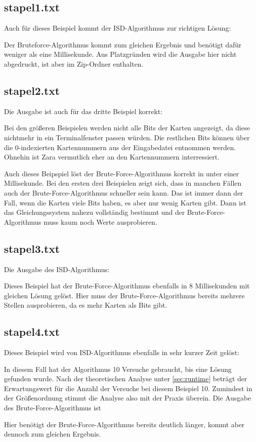 \documentclass[a4paper,10pt,ngerman]{scrartcl}
\begin{document}
\subsection*{stapel1.txt}
Auch für dieses Beispiel kommt der ISD-Algorithmus zur richtigen Lösung:

Der Bruteforce-Algorithmus kommt zum gleichen Ergebnis und benötigt dafür weniger als eine Millisekunde. Aus Platzgründen wird die Ausgabe hier nicht abgedruckt, ist aber im Zip-Ordner enthalten.
\subsection*{stapel2.txt}
Die Ausgabe ist auch für das dritte Beispiel korrekt:

Bei den größeren Beispielen werden nicht alle Bits der Karten angezeigt, da diese nichtmehr in ein Terminalfenster passen würden. Die restlichen Bits können über die 0-indexierten Kartennummern aus der Eingabedatei entnommen werden. Ohnehin ist Zara vermutlich eher an den Kartennummern interressiert. 

Auch dieses Beipspiel löst der Brute-Force-Algorithmus korrekt in unter einer Millisekunde. Bei den ersten drei Beispielen zeigt sich, dass in manchen Fällen auch der Brute-Force-Algorithmus schneller sein kann. Das ist immer dann der Fall, wenn die Karten viele Bits haben, es aber nur wenig Karten gibt. Dann ist das Gleichungssystem nahezu vollständig bestimmt und der Brute-Force-Algorithmus muss kaum noch Werte ausprobieren. 
\subsection*{stapel3.txt}
Die Ausgabe des ISD-Algorithmus:

Dieses Beispiel hat der Brute-Force-Algorithmus ebenfalls in 8 Millisekunden mit gleichen Lösung gelöst.
Hier muss der Brute-Force-Algorithmus bereits mehrere Stellen ausprobieren, da es mehr Karten als Bits gibt.
\subsection*{stapel4.txt}
Dieses Beispiel wird von ISD-Algorithmus ebenfalls in sehr kurzer Zeit gelöst:

In diesem Fall hat der Algorithmus 10 Versuche gebraucht, bis eine Lösung gefunden wurde. Nach der theoretischen Analyse unter \ref{sec:runtime} beträgt der Erwartungswert für die Anzahl der Versuche bei diesem Beispiel 10. Zumindest in der Größenordnung stimmt die Analyse also mit der Praxis überein. 
Die Ausgabe des Brute-Force-Algorithmus ist

Hier benötigt der Brute-Force-Algorithmus bereits deutlich länger, kommt aber dennoch zum gleichen Ergebnis. 
\end{document}
